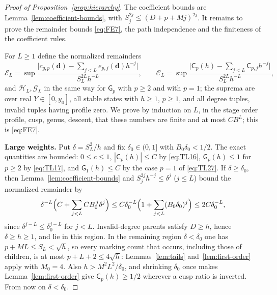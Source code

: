 \begin{proof}[Proof of Proposition~\ref{prop:hierarchy}]
The coefficient bounds are Lemma~\ref{lem:coefficient-bounds}, with
$S_j^{2j}\le(D+p+Mj)^{2j}$. It remains to prove the remainder bounds
\eqref{eq:FE7}, the path independence and the finiteness of the
coefficient rules.

For $L\ge1$ define the normalized remainders
\[
 \mathscr E_L=\sup\frac{\bigl|c_{g,p}(\mathbf d)-\sum_{j<L}e_{p,j}(\mathbf d)h^{-j}\bigr|}{S_L^{2L}h^{-L}},
 \qquad
 \mathscr C_L=\sup\frac{\bigl|\mathsf C_p(h)-\sum_{j<L}\mathsf C_{p,j}h^{-j}\bigr|}{S_L^{2L}h^{-L}},
\]
and $\mathscr H_L,\mathscr G_L$ in the same way for $\mathsf G_p$ with
$p\ge2$ and with $p=1$; the suprema are over real $Y\in[0,y_0]$, all
stable states with $h\ge1$, $p\ge1$, and all degree tuples, invalid
tuples having profile zero. We prove by induction on $L$, in the stage
order profile, cusp, genus, descent, that these numbers are finite and
at most $CB^L$; this is \eqref{eq:FE7}.

\textbf{Large weights.} Put $\delta=S_L^2/h$ and fix $\delta_0\in(0,1]$
with $B_0\delta_0<1/2$. The exact quantities are bounded: $0\le c\le1$,
$|\mathsf C_p(h)|\le C$ by \eqref{eq:TL16}, $\mathsf G_p(h)\le1$ for
$p\ge2$ by \eqref{eq:TL17}, and $\mathsf G_1(h)\le C$ by the case $p=1$ of \eqref{eq:TL27}.
If $\delta\ge\delta_0$, then Lemma~\ref{lem:coefficient-bounds} and $S_j^{2j}h^{-j}\le\delta^j$
($j\le L$) bound the normalized remainder by
\[
 \delta^{-L}\Bigl(C+\sum_{j<L}CB_0^{\,j}\delta^{j}\Bigr)
 \le C\delta_0^{-L}\Bigl(1+\sum_{j<L}(B_0\delta_0)^j\Bigr)\le2C\delta_0^{-L},
\]
since $\delta^{j-L}\le\delta_0^{j-L}$ for $j<L$. Invalid-degree parents
satisfy $D\ge h$, hence $\delta\ge h\ge1$, and lie in this region. In the remaining region
$\delta<\delta_0$ one has $p+ML\le S_L<\sqrt h$, so every marking count
that occurs, including those of children, is at most $p+L+2\le4\sqrt h$:
Lemmas~\ref{lem:tails} and~\ref{lem:first-order} apply with $M_0=4$. Also $h>M^2L^2/\delta_0$, and
shrinking $\delta_0$ once makes Lemma~\ref{lem:first-order} give $\mathsf C_p(h)\ge1/2$
wherever a cusp ratio is inverted. From now on $\delta<\delta_0$.


\end{proof}
